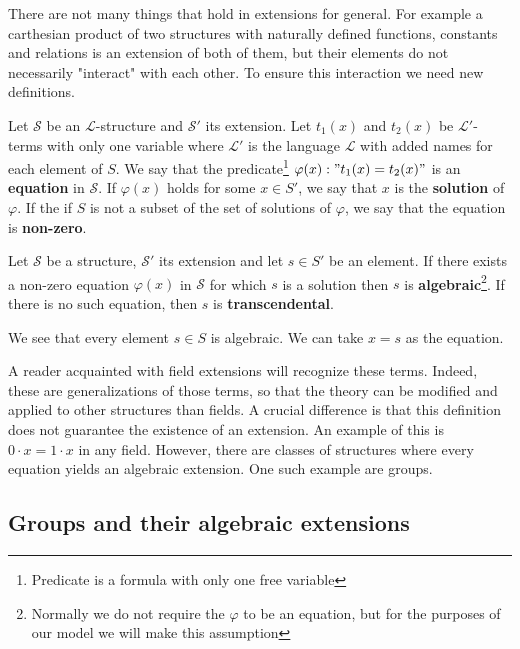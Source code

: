 There are not many things that hold in extensions for general. For example a carthesian product of two structures with naturally defined functions, constants and relations is an extension of both of them, but their elements do not necessarily "interact" with each other. To ensure this interaction we need new definitions.

\begin{defn}
	Let $\mathcal{S}$ be an $\mathcal{L}$-structure and $\mathcal{S}'$ its extension. Let $t_1(x)$ and $t_2(x)$ be $\mathcal{L}'$-terms with only one variable where $\mathcal{L}'$ is the language $\mathcal{L}$ with added names for each element of $S$. We say that the predicate\footnote{Predicate is a formula with only one free variable} $\varphi(x): "t_1(x)=t_2(x)"$ is an \textbf{equation} in $\mathcal{S}$. If $\varphi(x)$ holds for some $x\in S'$, we say that $x$ is the \textbf{solution} of $\varphi$. If the if $S$ is not a subset of the set of solutions of $\varphi$, we say that the equation is \textbf{non-zero}.
\end{defn}
\begin{defn}	
	Let $\mathcal{S}$ be a structure, $\mathcal{S}'$ its extension and let $s\in S'$ be an element. If there exists a non-zero equation $\varphi(x)$ in $\mathcal{S}$ for which $s$ is a solution then $s$ is \textbf{algebraic}\footnote{Normally we do not require the $\varphi$ to be an equation, but for the purposes of our model we will make this assumption}. If there is no such equation, then $s$ is \textbf{transcendental}.
\end{defn}

We see that every element $s\in S$ is algebraic. We can take $x=s$ as the equation.

A reader acquainted with field extensions will recognize these terms. Indeed, these are generalizations of those terms, so that the theory can be modified and applied to other structures than fields. A crucial difference is that this definition does not guarantee the existence of an extension. An example of this is $0\cdot x=1\cdot x$ in any field. However, there are classes of structures where every equation yields an algebraic extension. One such example are groups.

\subsection{Groups and their algebraic extensions}
\label{section:groups}

